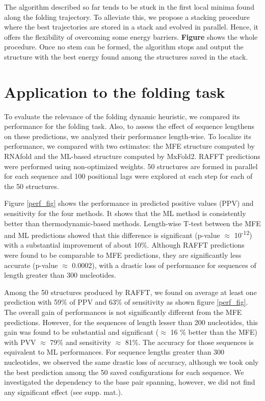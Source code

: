 \documentclass[a4paper,12pt]{article}
\begin{document}
{{The algorithm described so far tends to be stuck in the first local minima found
along the folding trajectory. To alleviate this, we propose a stacking procedure
where the best trajectories are stored in a stack and evolved in parallel.
Hence, it offers the flexibility of overcoming some energy barriers. \textbf{Figure}
shows the whole procedure. Once no stem can be formed, the algorithm stops and
output the structure with the best energy found among the structures saved in
the stack.

\section{Application to the folding task}
\label{sec:orgac48060}
To evaluate the relevance of the folding dynamic heuristic, we compared its
performance for the folding task. Also, to assess the effect of sequence
lengthens on these predictions, we analyzed their performance length-wise. To
localize its performance, we compared with two estimates: the MFE structure
computed by RNAfold and the ML-based structure computed by MxFold2. RAFFT
predictions were performed using non-optimized weights. 50 structures are formed
in parallel for each sequence and 100 positional lags were explored at each step
for each of the 50 structures.

Figure \ref{perf_fig} shows the performance in predicted positive values (PPV) and
sensitivity for the four methods. It shows that the ML method is consistently
better than thermodynamic-based methods. Length-wise T-test between the MFE and
ML predictions showed that this difference is significant (p-value \(\approx\)
10\textsuperscript{-12}) with a substantial improvement of about 10\%. Although RAFFT
predictions were found to be comparable to MFE predictions, they are
significantly less accurate (p-value \(\approx\) 0.0002), with a drastic loss of
performance for sequences of length greater than 300 nucleotides.

Among the 50 structures produced by RAFFT, we found on average at least one
prediction with 59\% of PPV and 63\% of sensitivity as shown figure \ref{perf_fig}.
The overall gain of performances is not significantly different from the MFE
predictions. However, for the sequences of length lesser than 200 nucleotides,
this gain was found to be substantial and significant (\(\approx\) 16 \% better than
the MFE) with PVV \(\approx\) 79\% and sensitivity \(\approx\) 81\%. The accuracy for
those sequences is equivalent to ML performances. For sequence lengths greater
than 300 nucleotides, we observed the same drastic loss of accuracy, although we
took only the best prediction among the 50 saved configurations for each
sequence. We investigated the dependency to the base pair spanning, however, we
did not find any significant effect (see supp. mat.).

}}
\end{document}
